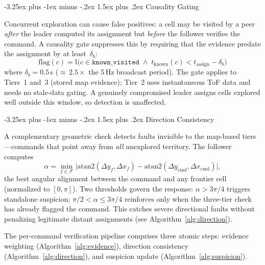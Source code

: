 \documentclass[conference]{IEEEtran}
\makeatletter
\renewcommand{\subsection}{\@startsection{subsection}{2}{\z@}%
  {-3.25ex plus -1ex minus -.2ex}%
  {1.5ex plus .2ex}%
  {\normalfont\normalsize\itshape\centering}}
\makeatother
\begin{document}
\subsection{Causality Gating}
\label{sec:causality}

Concurrent exploration can cause false positives: a cell may be visited by a peer \emph{after} the leader computed its assignment but \emph{before} the follower verifies the command. A causality gate suppresses this by requiring that the evidence predate the assignment by at least~$\delta_b$:
\begin{equation}
    \text{flag}(c) = \mathbb{I}\bigl(c \in \texttt{known\_visited}
    \;\wedge\; t_{\text{known}}(c) < t_{\text{assign}} - \delta_b\bigr)
\end{equation}
where $\delta_b = 0.5\,$s (${\approx}\,2.5\times$ the 5\,Hz broadcast period). The gate applies to Tiers~1 and~3 (stored map evidence); Tier~2 uses instantaneous ToF data and needs no stale-data gating. A genuinely compromised leader assigns cells explored well outside this window, so detection is unaffected.

\subsection{Direction Consistency}
\label{sec:direction_consistency}

A complementary geometric check detects faults invisible to the map-based tiers---commands that point away from \emph{all} unexplored territory. The follower computes
\begin{equation}
    \alpha = \min_{f \in \mathcal{F}} \bigl|\text{atan2}(\Delta y_f,
    \Delta x_f) - \text{atan2}(\Delta y_{\text{cmd}},
    \Delta x_{\text{cmd}})\bigr|,
\end{equation}
the best angular alignment between the command and any frontier cell (normalized to $[0,\pi]$). Two thresholds govern the response: $\alpha > 3\pi/4$ triggers standalone suspicion; $\pi/2 < \alpha \leq 3\pi/4$ reinforces only when the three-tier check has already flagged the command. This catches severe directional faults without penalizing legitimate distant assignments (see Algorithm~\ref{alg:direction}).

The per-command verification pipeline comprises three atomic steps: evidence weighting (Algorithm~\ref{alg:evidence}), direction consistency (Algorithm~\ref{alg:direction}), and suspicion update (Algorithm~\ref{alg:suspicion}).
\end{document}
